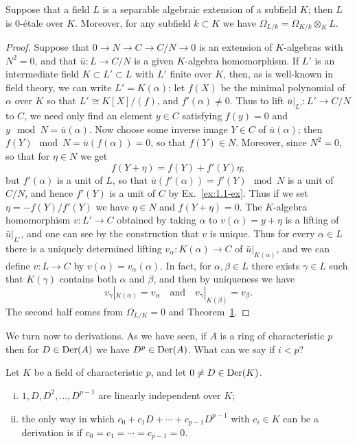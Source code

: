 \begin{theorem}\label{thm:25.3}
Suppose that a field $L$ is a separable algebraic extension of a subfield $K$; then
$L$ is 0-\'etale over $K$. Moreover, for any subfield $k \subset K$ we have
$\Omega_{L/k} = \Omega_{K/k} \otimes_K L$.
\end{theorem}

\begin{proof}
Suppose that $0 \to N \to C \to C/N \to 0$ is an extension of $K$-algebras with
$N^2 = 0$, and that $\bar{u}\colon L \to C/N$ is a given $K$-algebra homomorphism. If $L'$ is an
intermediate field $K \subset L' \subset L$ with $L'$ finite over $K$, then, as is well-known in
field theory, we can write $L' = K(\alpha)$; let $f(X)$ be the minimal polynomial of
$\alpha$ over $K$ so that $L' \cong K[X]/(f)$, and $f'(\alpha) \neq 0$. Thus to lift
$\bar{u}|_{L'}\colon L' \to C/N$ to $C$, we need only find an element $y \in C$ satisfying
$f(y) = 0$ and $y \mod N = \bar{u}(\alpha)$. Now choose some inverse image $Y \in C$ of
$\bar{u}(\alpha)$; then $f(Y) \mod N = \bar{u}(f(\alpha)) = 0$, so that $f(Y) \in N$. Moreover,
since $N^2 = 0$, so that for $\eta \in N$ we get
\[
  f(Y + \eta) = f(Y) + f'(Y)\eta;
\]
but $f'(\alpha)$ is a unit of $L$, so that $\bar{u}(f'(\alpha)) = f'(Y) \mod N$ is a unit of
$C/N$, and hence $f'(Y)$ is a unit of $C$ by Ex.~\ref{ex:1.1-ex}. Thus if we set
$\eta = -f(Y)/f'(Y)$ we have $\eta \in N$ and $f(Y + \eta) = 0$. The $K$-algebra
homomorphism $v\colon L' \to C$ obtained by taking $\alpha$ to $v(\alpha) = y + \eta$ is a
lifting of $\bar{u}|_{L'}$, and one can see by the construction that $v$ is unique. Thus for
every $\alpha \in L$ there is a uniquely determined lifting $v_\alpha\colon K(\alpha) \to C$ of
$\bar{u}|_{K(\alpha)}$, and we can define $v\colon L \to C$ by $v(\alpha) = v_\alpha(\alpha)$. In fact, for
$\alpha, \beta \in L$ there exists $\gamma \in L$ such that $K(\gamma)$ contains both $\alpha$ and
$\beta$, and then by uniqueness we have
\[
  v_\gamma|_{K(\alpha)} = v_\alpha \quad \text{and} \quad v_\gamma|_{K(\beta)} = v_\beta.
\]
The second half comes from $\Omega_{L/K} = 0$ and Theorem~\hyperref[thm:25.1]{1}.
\end{proof}

We turn now to derivations. As we have seen, if $A$ is a ring of characteristic $p$
then for $D \in \operatorname{Der}(A)$ we have $D^p \in \operatorname{Der}(A)$. What can we say if $i < p$?

\begin{theorem}\label{thm:25.4}
Let $K$ be a field of characteristic $p$, and let $0 \ne D \in \operatorname{Der}(K)$.
\begin{enumerate}[(i)]
  \item $1, D, D^2, \ldots, D^{p-1}$ are linearly independent over $K$;
  \item the only way in which $c_0 + c_1D + \cdots + c_{p-1}D^{p-1}$ with $c_i \in K$ can be
        a derivation is if $c_0 = c_1 = \cdots = c_{p-1} = 0$.
\end{enumerate}
\end{theorem}

